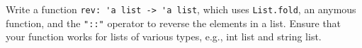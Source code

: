 Write a function \mbox{\lstinline{rev: 'a list -> 'a list}}, which uses \lstinline{List.fold}, an anymous function, and the \lstinline{"::"} operator to reverse the elements in a list. Ensure that your function works for lists of various types, e.g., int list and string list.
